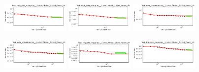 \documentclass{article} %
\begin{document}
\begin{figure}[]
    \centering

\vspace*{-9.0mm}

\hspace*{-1.0mm}\includegraphics[width=0.2975\textwidth]{figures/scaling_laws_benchmark_dataset_plots/__mult_data_wrangling_,__1-shot_____262M.png}
\hspace*{1.0mm}\includegraphics[width=0.2975\textwidth]{figures/scaling_laws_benchmark_dataset_plots/__mult_data_wrangling_,__2-shot_____262M.png}
\hspace*{1.0mm}\includegraphics[width=0.2975\textwidth]{figures/scaling_laws_benchmark_dataset_plots/__date_understanding_,__1-shot_____262M.png}

\vspace{-0.5mm}

\hspace*{-1.0mm}\includegraphics[width=0.2975\textwidth]{figures/scaling_laws_benchmark_dataset_plots/__date_understanding_,__2-shot_____262M.png}
\hspace*{1.0mm}\includegraphics[width=0.2975\textwidth]{figures/scaling_laws_benchmark_dataset_plots/__linguistic_mappings_,__1-shot_____262M.png}
\hspace*{1.0mm}\includegraphics[width=0.2975\textwidth]{figures/scaling_laws_benchmark_dataset_plots/__linguistic_mappings_,__2-shot_____262M.png}


\end{figure}
\end{document}
